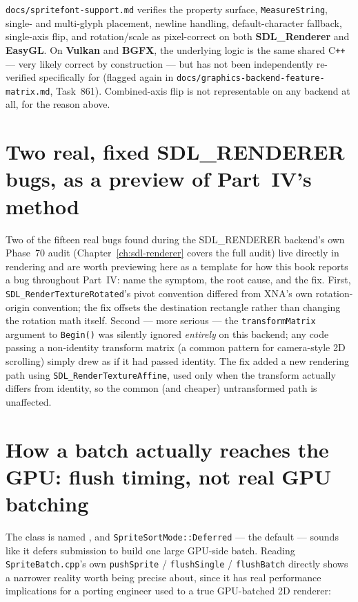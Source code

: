 \texttt{docs/spritefont-support.md} verifies the property surface, \texttt{MeasureString},
single- and multi-glyph placement, newline handling, default-character fallback, single-axis
flip, and rotation/scale as pixel-correct on both \textbf{SDL\_Renderer} and \textbf{EasyGL}.
On \textbf{Vulkan} and \textbf{BGFX}, the underlying logic is the same shared C\texttt{++} ---
very likely correct by construction --- but has not been independently re-verified
specifically for  (flagged again in
\texttt{docs/\allowbreak{}graphics-\allowbreak{}backend-\allowbreak{}feature-\allowbreak{}matrix.md},
Task~861). Combined-axis flip is not
representable on any backend at all, for the  reason above.

\section{Two real, fixed SDL\_RENDERER bugs, as a preview of Part~IV's method}
\label{sec:sdl-renderer-two-bugs}

Two of the fifteen real bugs found during the SDL\_RENDERER backend's own Phase~70 audit
(Chapter~\ref{ch:sdl-renderer} covers the full audit) live directly in 
rendering and are worth previewing here as a template for how this book reports a bug
throughout Part~IV: name the symptom, the root cause, and the fix. First,
\texttt{SDL\_RenderTextureRotated}'s pivot convention differed from XNA's own rotation-origin
convention; the fix offsets the destination rectangle rather than changing the rotation math
itself. Second --- more serious --- the \texttt{transformMatrix} argument to
\texttt{Begin()} was silently ignored \emph{entirely} on this backend; any code passing a
non-identity transform matrix (a common pattern for camera-style 2D scrolling) simply drew as
if it had passed identity. The fix added a new rendering path using
\texttt{SDL\_RenderTextureAffine}, used only when the transform actually differs from
identity, so the common (and cheaper) untransformed path is unaffected.

\section{How a batch actually reaches the GPU: flush timing, not real GPU batching}
\label{sec:spritebatch-flush-timing}

The class is named , and \texttt{SpriteSortMode::Deferred} --- the
default --- sounds like it defers submission to build one large GPU-side batch. Reading
\texttt{SpriteBatch.cpp}'s own \texttt{pushSprite} / \texttt{flushSingle} / \texttt{flushBatch}
directly shows a narrower reality worth being precise about, since it has real performance
implications for a porting engineer used to a true GPU-batched 2D renderer:

